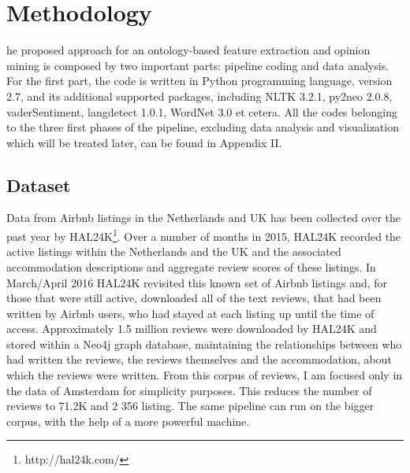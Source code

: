 %
%
\let\textcircled=\pgftextcircled
\chapter{Methodology}
\label{chap:methods}
he proposed approach for an ontology-based feature extraction and opinion mining is composed by two important parts: pipeline coding and data analysis. For the first part, the code is written in Python programming language, version 2.7, and its additional supported packages, including NLTK 3.2.1, py2neo 2.0.8, vaderSentiment, langdetect 1.0.1, WordNet 3.0 et cetera. All the codes belonging to the three first phases of the pipeline, excluding data analysis and visualization which will be treated later, can be found in Appendix II.
%
%
\section{Dataset}
%
%

Data from Airbnb listings in the Netherlands and UK has been collected over the past year by HAL24K\footnote{http://hal24k.com/}. Over a number of months in 2015, HAL24K recorded the active listings within the Netherlands and the UK and the associated accommodation descriptions and aggregate review scores of these listings. In March/April 2016 HAL24K revisited this known set of Airbnb listings and, for those that were still active, downloaded all of the text reviews, that had been written by Airbnb users, who had stayed at each listing up until the time of access. Approximately 1.5 million reviews were downloaded by HAL24K and stored within a Neo4j graph database, maintaining the relationships between who had written the reviews, the reviews themselves and the accommodation, about which the reviews were written. From this corpus of reviews, I am focused only in the data of Amsterdam for simplicity purposes. This reduces the number of reviews to 71.2K and 2 356 listing. The same pipeline can run on the bigger corpus, with the help of a more powerful machine. 
%
%

